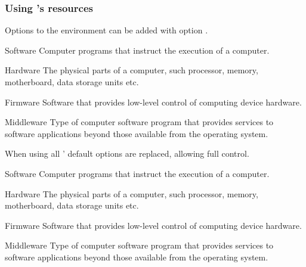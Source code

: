 \documentclass[a4paper, 11pt]{article}
\begin{document}
\subsubsection*{Using 's resources}

Options to the  environment can be added with option .

\begin{example}{}
    \begin{tcolorbox}[colback = black]
        \begin{PLTBoxRaster}[raster = {raster equal height = none, raster valign = top, raster columns = 4}]
            \item[Software] Computer programs that instruct the execution of a computer.
            \item[Hardware]The physical parts of a computer, such processor, memory, motherboard, data storage units etc.
            \item[Firmware] Software that provides low-level control of computing device hardware.
            \item[Middleware] Type of computer software program that provides services to software applications beyond those available from the operating system.
        \end{PLTBoxRaster}
    \end{tcolorbox}
\end{example}

When using  all ' default options are replaced, allowing full control.

\begin{example}{}
    \begin{PLTBoxRaster}[raster set = {}]  %
        \item[Software] Computer programs that instruct the execution of a computer.
        \item[Hardware]The physical parts of a computer, such processor, memory, motherboard, data storage units etc.
        \item[Firmware] Software that provides low-level control of computing device hardware.
        \item[Middleware] Type of computer software program that provides services to software applications beyond those available from the operating system.
    \end{PLTBoxRaster}
\end{example}
\end{document}
